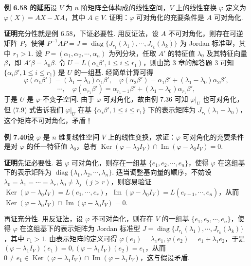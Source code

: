 \documentclass[UTF8, 12pt, fontset=fandol, oneside]{ctexart}
\begin{document}
\noindent\textbf{例 6.58 的延拓}\quad 设 $V$ 为 $n$ 阶矩阵全体构成的线性空间，$V$ 上的线性变换 $\varphi$ 定义为 $\varphi(X)=AX-XA$，其中 $A\in V$. 证明：$\varphi$ 可对角化的充要条件是 $A$ 可对角化.

\noindent\textbf{证明}\quad 充分性就是例 6.58，下证必要性. 用反证法，设 $A$ 不可对角化，则存在可逆矩阵 $P$，使得 $P^{-1}AP=J=\operatorname{diag}\{J_{r_1}(\lambda_1),\cdots,J_{r_k}(\lambda_k)\}$ 为 Jordan 标准型，其中 $r_1>1$. 设 $P=(\alpha_1,\alpha_2,\cdots,\alpha_n)$ 为列分块，任取 $A'$ 的特征值 $\lambda_0$ 及其特征向量 $\beta$，即 $A'\beta=\lambda_0\beta$. 令 $U=L(\alpha_i\beta',1\le i\le r_1)$，则由第 3 章的解答题 3 可知 $\{\alpha_i\beta',1\le i\le r_1\}$ 是 $U$ 的一组基. 经简单计算可得
\begin{equation}
\varphi(\alpha_1\beta')=(\lambda_1-\lambda_0)\alpha_1\beta',\quad
\varphi(\alpha_2\beta')=\alpha_1\beta'+(\lambda_1-\lambda_0)\alpha_2\beta',
\end{equation}
\[
\cdots,\quad
\varphi(\alpha_{r_1}\beta')=\alpha_{r_1-1}\beta'+(\lambda_1-\lambda_0)\alpha_{r_1}\beta',
\tag{7.9}
\]
于是 $U$ 是 $\varphi$-不变子空间. 由于 $\varphi$ 可对角化，故由例 7.36 可知 $\varphi|_U$ 也可对角化，但 (7.9) 式告诉我们 $\varphi|_U$ 在基 $\{\alpha_i\beta',1\le i\le r_1\}$ 下的表示矩阵为 $J_{r_1}(\lambda_1-\lambda_0)$，这个矩阵不可对角化，矛盾！

\noindent\textbf{例 7.40}\quad 设 $\varphi$ 是 $n$ 维复线性空间 $V$ 上的线性变换，求证：$\varphi$ 可对角化的充要条件是对 $\varphi$ 的任一特征值 $\lambda_0$，总有 $\operatorname{Ker}(\varphi-\lambda_0I_V)\cap\operatorname{Im}(\varphi-\lambda_0I_V)=0$.

\noindent\textbf{证明}\quad 先证必要性. 若 $\varphi$ 可对角化，则存在一组基 $\{e_1,e_2,\cdots,e_n\}$，使得 $\varphi$ 在这组基下的表示矩阵为 $\operatorname{diag}\{\lambda_1,\lambda_2,\cdots,\lambda_n\}$. 适当调整基向量的顺序，不妨设 $\lambda_0=\lambda_1=\cdots=\lambda_r,\lambda_0\ne\lambda_j$ $(j>r)$，则容易验证 $\operatorname{Ker}(\varphi-\lambda_0I_V)=L(e_1,\cdots,e_r)$，$\operatorname{Im}(\varphi-\lambda_0I_V)=L(e_{r+1},\cdots,e_n)$，从而 $\operatorname{Ker}(\varphi-\lambda_0I_V)\cap\operatorname{Im}(\varphi-\lambda_0I_V)=0$.

再证充分性. 用反证法，设 $\varphi$ 不可对角化，则存在 $V$ 的一组基 $\{e_1,e_2,\cdots,e_n\}$，使得 $\varphi$ 在这组基下的表示矩阵为 Jordan 标准型 $J=\operatorname{diag}\{J_{r_1}(\lambda_1),\cdots,J_{r_k}(\lambda_k)\}$，其中 $r_1>1$. 由表示矩阵的定义可得 $\varphi(e_1)=\lambda_1e_1,\varphi(e_2)=e_1+\lambda_1e_2$，于是 $(\varphi-\lambda_1I_V)(e_1)=0,(\varphi-\lambda_1I_V)(e_2)=e_1$，从而 $0\ne e_1\in\operatorname{Ker}(\varphi-\lambda_1I_V)\cap\operatorname{Im}(\varphi-\lambda_1I_V)$，这与假设矛盾.
\end{document}
